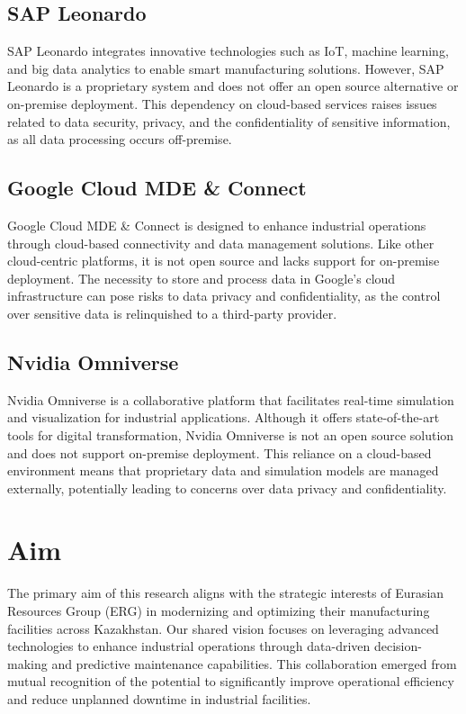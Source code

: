 \subsection{SAP Leonardo}
SAP Leonardo integrates innovative technologies such as IoT, machine learning, and big data analytics to enable smart manufacturing solutions. \cite{sap-2024} However, SAP Leonardo is a proprietary system and does not offer an open source alternative or on-premise deployment. This dependency on cloud-based services raises issues related to data security, privacy, and the confidentiality of sensitive information, as all data processing occurs off-premise.

\subsection{Google Cloud MDE \& Connect}
Google Cloud MDE \& Connect is designed to enhance industrial operations through cloud-based connectivity and data management solutions. \cite{rao-2024} Like other cloud-centric platforms, it is not open source and lacks support for on-premise deployment. The necessity to store and process data in Google’s cloud infrastructure can pose risks to data privacy and confidentiality, as the control over sensitive data is relinquished to a third-party provider.

\subsection{Nvidia Omniverse}
Nvidia Omniverse is a collaborative platform that facilitates real-time simulation and visualization for industrial applications. \cite{nvidia-2025} Although it offers state-of-the-art tools for digital transformation, Nvidia Omniverse is not an open source solution and does not support on-premise deployment. This reliance on a cloud-based environment means that proprietary data and simulation models are managed externally, potentially leading to concerns over data privacy and confidentiality.

\section{Aim}

The primary aim of this research aligns with the strategic interests of Eurasian Resources Group (ERG) in modernizing and optimizing their manufacturing facilities across Kazakhstan. Our shared vision focuses on leveraging advanced technologies to enhance industrial operations through data-driven decision-making and predictive maintenance capabilities. This collaboration emerged from mutual recognition of the potential to significantly improve operational efficiency and reduce unplanned downtime in industrial facilities.

